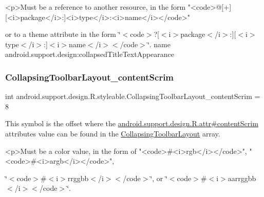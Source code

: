 \begin{DoxyVerb}      <p>Must be a reference to another resource, in the form "<code>@[+][<i>package</i>:]<i>type</i>:<i>name</i></code>"
\end{DoxyVerb}
 or to a theme attribute in the form \char`\"{}$<$code$>$?\mbox{[}$<$i$>$package$<$/i$>$\+:\mbox{]}\mbox{[}$<$i$>$type$<$/i$>$\+:\mbox{]}$<$i$>$name$<$/i$>$$<$/code$>$\char`\"{}.  name android.\+support.\+design\+:collapsed\+Title\+Text\+Appearance \mbox{\label{classandroid_1_1support_1_1design_1_1R_1_1styleable_aaae4497bf3d18eafeeaff35e11812145}} 
\subsubsection{\texorpdfstring{Collapsing\+Toolbar\+Layout\+\_\+content\+Scrim}{CollapsingToolbarLayout\_contentScrim}}
{\footnotesize\ttfamily int android.\+support.\+design.\+R.\+styleable.\+Collapsing\+Toolbar\+Layout\+\_\+content\+Scrim = 8\hspace{0.3cm}{\ttfamily [static]}}

This symbol is the offset where the \hyperlink{classandroid_1_1support_1_1design_1_1R_1_1attr_a244937ae170a7899c67a98528a168397}{android.\+support.\+design.\+R.\+attr\#content\+Scrim} attribute\textquotesingle{}s value can be found in the \hyperlink{classandroid_1_1support_1_1design_1_1R_1_1styleable_a4a019838b1c3daad84b4ffff397db335}{Collapsing\+Toolbar\+Layout} array.

\begin{DoxyVerb}      <p>Must be a color value, in the form of "<code>#<i>rgb</i></code>", "<code>#<i>argb</i></code>",
\end{DoxyVerb}
 \char`\"{}$<$code$>$\#$<$i$>$rrggbb$<$/i$>$$<$/code$>$\char`\"{}, or \char`\"{}$<$code$>$\#$<$i$>$aarrggbb$<$/i$>$$<$/code$>$\char`\"{}. 

